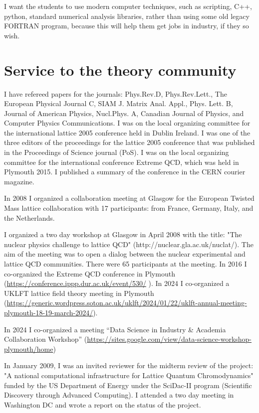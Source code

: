 \documentclass[12pt]{article}
\begin{document}
I want the students to use modern computer
techniques, such as scripting, C++, python, standard numerical
analysis libraries, rather than using some old legacy
FORTRAN program, because this will help them 
get jobs in industry, if they so wish.



\section{Service to the theory community}

I have refereed papers for the journals: Phys.Rev.D, Phys.Rev.Lett.,
The European Physical Journal C, SIAM J. Matrix Anal. Appl.,
Phys. Lett. B, Journal of American Physics, Nucl.Phys. A, 
Canadian Journal of Physics,
and 
Computer Physics Communications.
I was on the local
organizing committee for the international lattice 2005 conference
held in Dublin Ireland. I was one of the three editors of the
proceedings for the lattice 2005 conference that was published in the
Proceedings of Science journal (PoS). I was on the local organizing
committee for the international conference Extreme QCD, which was held
in Plymouth 2015. I published a summary of the conference in the CERN 
courier magazine.

In 2008 I organized a collaboration meeting at Glasgow for the
European Twisted Mass lattice collaboration with 17 participants: from
France, Germany, Italy, and the Netherlands.

I organized a two day workshop at Glasgow in April 2008 with the
title: "The nuclear physics challenge to lattice QCD"
(http://nuclear.gla.ac.uk/nuclat/). The aim of the meeting was to
open a dialog between the nuclear experimental and lattice
QCD communities. There were 65 participants at the meeting.
In 2016 I co-organized the Extreme QCD conference in Plymouth
(\url{https://conference.ippp.dur.ac.uk/event/530/} ). In 2024
I co-organized a UKLFT lattice field theory meeting in
Plymouth (\url{https://generic.wordpress.soton.ac.uk/uklft/2024/01/22/uklft-annual-meeting-plymouth-18-19-march-2024/}).

In 2024 I co-organized a meeting
``Data Science in Industry \& Academia Collaboration Workshop''
(\url{https://sites.google.com/view/data-science-workshop-plymouth/home})


In January 2009, I was an invited reviewer for the midterm review of
the project: "A national computational infrastructure for Lattice
Quantum Chromodynamics" funded by the US Department of Energy 
under the SciDac-II program (Scientific Discovery 
through Advanced Computing).
I attended a two day meeting in Washington DC and wrote a report
on the status of the project.
\end{document}
